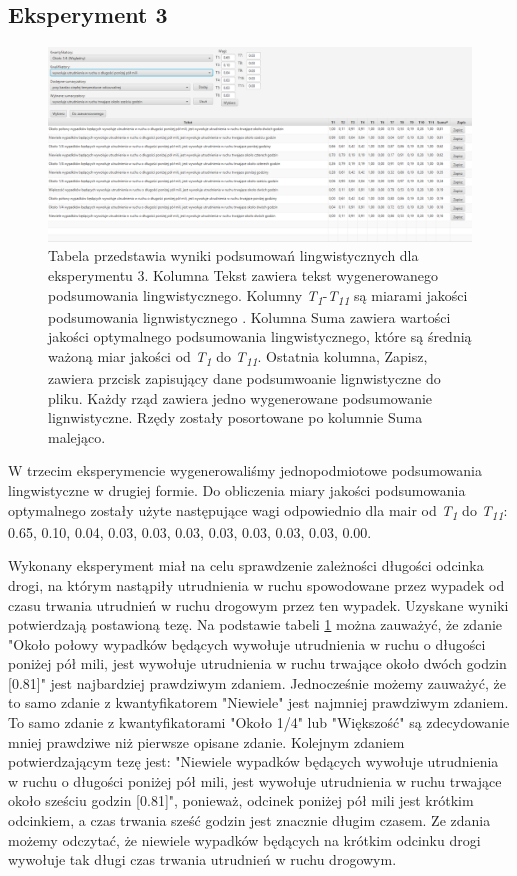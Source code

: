 \documentclass{classrep}
\begin{document}
\subsection{Eksperyment 3}
\label{section:ex3}
\begin{figure}[h!]
\centering
\includegraphics[width=15cm]{ex3.png}
\vspace{-0.3cm}
\caption{Tabela przedstawia wyniki podsumowań lingwistycznych dla eksperymentu 3. Kolumna Tekst zawiera tekst wygenerowanego podsumowania lingwistycznego. Kolumny \textit{T\textsubscript{1}}-\textit{T\textsubscript{11}} są miarami jakości podsumowania lignwistycznego \cite{niewiadomski19}. Kolumna Suma zawiera wartości jakości optymalnego podsumowania lingwistycznego, które są średnią ważoną miar jakości od \textit{T\textsubscript{1}} do \textit{T\textsubscript{11}}. Ostatnia kolumna, Zapisz, zawiera przcisk zapisujący dane podsumwoanie lignwistyczne do pliku. Każdy rząd zawiera jedno wygenerowane podsumowanie lignwistyczne. Rzędy zostały posortowane po kolumnie Suma malejąco. }
\label{ex3}
\end{figure}

W trzecim eksperymencie wygenerowaliśmy jednopodmiotowe podsumowania lingwistyczne w drugiej formie. Do obliczenia miary jakości podsumowania optymalnego zostały użyte następujące wagi odpowiednio dla mair od \textit{T\textsubscript{1}} do \textit{T\textsubscript{11}}: 0.65, 0.10, 0.04, 0.03, 0.03, 0.03, 0.03, 0.03, 0.03, 0.03, 0.00.

Wykonany eksperyment miał na celu sprawdzenie zależności długości odcinka drogi, na którym nastąpiły utrudnienia w ruchu spowodowane przez wypadek od czasu trwania utrudnień w ruchu drogowym przez ten wypadek. Uzyskane wyniki potwierdzają postawioną tezę. Na podstawie tabeli \ref{ex3} można zauważyć, że zdanie "Około połowy wypadków będących wywołuje utrudnienia w ruchu o długości poniżej pół mili, jest wywołuje utrudnienia w ruchu trwające około dwóch godzin [0.81]" jest najbardziej prawdziwym zdaniem. Jednocześnie możemy zauważyć, że to samo zdanie z kwantyfikatorem "Niewiele" jest najmniej prawdziwym zdaniem. To samo zdanie z kwantyfikatorami "Około 1/4" lub "Większość" są zdecydowanie mniej prawdziwe niż pierwsze opisane zdanie. Kolejnym zdaniem potwierdzającym tezę jest: "Niewiele wypadków będących wywołuje utrudnienia w ruchu o długości poniżej pół mili, jest wywołuje utrudnienia w ruchu trwające około sześciu godzin [0.81]", ponieważ, odcinek poniżej pół mili jest krótkim odcinkiem, a czas trwania sześć godzin jest znacznie długim czasem. Ze zdania możemy odczytać, że niewiele wypadków będących na krótkim odcinku drogi wywołuje tak długi czas trwania utrudnień w ruchu drogowym.
\end{document}
